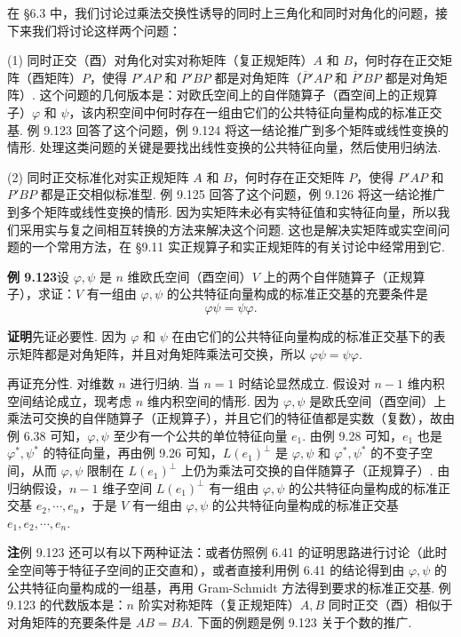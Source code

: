 \documentclass[UTF8, 12pt, fontset=fandol, oneside]{ctexart}
\begin{document}
在 §6.3 中，我们讨论过乘法交换性诱导的同时上三角化和同时对角化的问题，接下来我们将讨论这样两个问题：

(1) 同时正交（酉）对角化\quad 对实对称矩阵（复正规矩阵）$A$ 和 $B$，何时存在正交矩阵（酉矩阵）$P$，使得 $P'AP$ 和 $P'BP$ 都是对角矩阵（$\overline{P}'AP$ 和 $\overline{P}'BP$ 都是对角矩阵）. 这个问题的几何版本是：对欧氏空间上的自伴随算子（酉空间上的正规算子）$\varphi$ 和 $\psi$，该内积空间中何时存在一组由它们的公共特征向量构成的标准正交基. 例 9.123 回答了这个问题，例 9.124 将这一结论推广到多个矩阵或线性变换的情形. 处理这类问题的关键是要找出线性变换的公共特征向量，然后使用归纳法.

(2) 同时正交标准化\quad 对实正规矩阵 $A$ 和 $B$，何时存在正交矩阵 $P$，使得 $P'AP$ 和 $P'BP$ 都是正交相似标准型. 例 9.125 回答了这个问题，例 9.126 将这一结论推广到多个矩阵或线性变换的情形. 因为实矩阵未必有实特征值和实特征向量，所以我们采用实与复之间相互转换的方法来解决这个问题. 这也是解决实矩阵或实空间问题的一个常用方法，在 §9.11 实正规算子和实正规矩阵的有关讨论中经常用到它.

\noindent\textbf{例 9.123}\quad 设 $\varphi,\psi$ 是 $n$ 维欧氏空间（酉空间）$V$ 上的两个自伴随算子（正规算子），求证：$V$ 有一组由 $\varphi,\psi$ 的公共特征向量构成的标准正交基的充要条件是
\[
\varphi\psi=\psi\varphi.
\]

\noindent\textbf{证明}\quad 先证必要性. 因为 $\varphi$ 和 $\psi$ 在由它们的公共特征向量构成的标准正交基下的表示矩阵都是对角矩阵，并且对角矩阵乘法可交换，所以 $\varphi\psi=\psi\varphi$.

再证充分性. 对维数 $n$ 进行归纳. 当 $n=1$ 时结论显然成立. 假设对 $n-1$ 维内积空间结论成立，现考虑 $n$ 维内积空间的情形. 因为 $\varphi,\psi$ 是欧氏空间（酉空间）上乘法可交换的自伴随算子（正规算子），并且它们的特征值都是实数（复数），故由例 6.38 可知，$\varphi,\psi$ 至少有一个公共的单位特征向量 $e_1$. 由例 9.28 可知，$e_1$ 也是 $\varphi^*,\psi^*$ 的特征向量，再由例 9.26 可知，$L(e_1)^\perp$ 是 $\varphi,\psi$ 和 $\varphi^*,\psi^*$ 的不变子空间，从而 $\varphi,\psi$ 限制在 $L(e_1)^\perp$ 上仍为乘法可交换的自伴随算子（正规算子）. 由归纳假设，$n-1$ 维子空间 $L(e_1)^\perp$ 有一组由 $\varphi,\psi$ 的公共特征向量构成的标准正交基 $e_2,\cdots,e_n$，于是 $V$ 有一组由 $\varphi,\psi$ 的公共特征向量构成的标准正交基 $e_1,e_2,\cdots,e_n$.

\noindent\textbf{注}\quad 例 9.123 还可以有以下两种证法：或者仿照例 6.41 的证明思路进行讨论（此时全空间等于特征子空间的正交直和），或者直接利用例 6.41 的结论得到由 $\varphi,\psi$ 的公共特征向量构成的一组基，再用 Gram-Schmidt 方法得到要求的标准正交基. 例 9.123 的代数版本是：$n$ 阶实对称矩阵（复正规矩阵）$A,B$ 同时正交（酉）相似于对角矩阵的充要条件是 $AB=BA$. 下面的例题是例 9.123 关于个数的推广.
\end{document}
